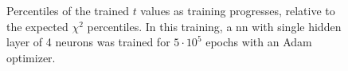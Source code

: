 \documentclass[paper/ddppaper2.tex]{subfiles}
\begin{document}
\begin{figure}
    \caption{Percentiles of the trained $t$ values as training progresses, relative to the expected $\chi^2$ percentiles. In this training, a \gls{nn} with single hidden layer of 4 neurons was trained for $5\cdot 10^5$ epochs with an Adam optimizer.}
    \label{fig:2d-nonconverging-percentiles}
\end{figure}
\end{document}
